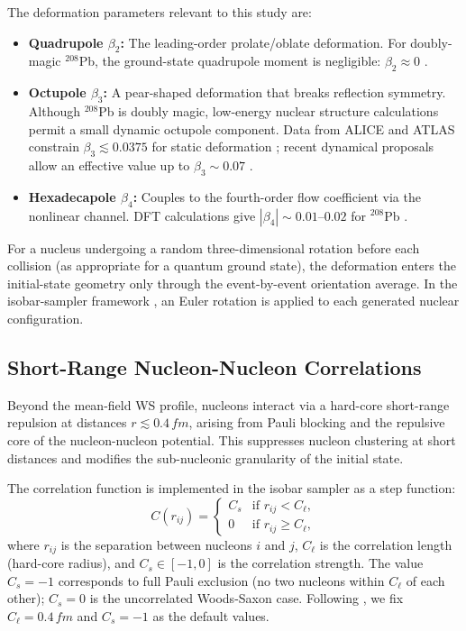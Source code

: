 \documentclass[12pt,a4paper,twoside]{report}
\begin{document}
The deformation parameters relevant to this study are:
\begin{itemize}[leftmargin=*]
  \item \textbf{Quadrupole $\beta_2$:}  The leading-order prolate/oblate
        deformation.  For doubly-magic $^{208}$Pb, the ground-state
        quadrupole moment is negligible: $\beta_2 \approx 0$
        \cite{Roca-Maza2018}.
  \item \textbf{Octupole $\beta_3$:}  A pear-shaped deformation that breaks
        reflection symmetry.  Although $^{208}$Pb is doubly magic, low-energy
        nuclear structure calculations permit a small dynamic octupole
        component.  Data from ALICE and ATLAS constrain
        $\beta_3 \lesssim 0.0375$ for static deformation \cite{Carzon2020};
        recent dynamical proposals allow an effective value up to
        $\beta_3 \sim 0.07$ \cite{Xu2025}.
  \item \textbf{Hexadecapole $\beta_4$:}  Couples to the fourth-order flow
        coefficient via the nonlinear channel.  DFT calculations give
        $|\beta_4| \sim 0.01$--$0.02$ for $^{208}$Pb \cite{Bally2022}.
\end{itemize}

For a nucleus undergoing a random three-dimensional rotation before
each collision (as appropriate for a quantum ground state), the
deformation enters the initial-state geometry only through the
event-by-event orientation average.  In the isobar-sampler framework
\cite{Luzum2023_sampler}, an Euler rotation is applied to each
generated nuclear configuration.

\subsection{Short-Range Nucleon-Nucleon Correlations}
\label{subsec:correlations}

Beyond the mean-field WS profile, nucleons interact via a hard-core
short-range repulsion at distances $r \lesssim 0.4\,\si{fm}$, arising
from Pauli blocking and the repulsive core of the nucleon-nucleon
potential.  This suppresses nucleon clustering at short distances and
modifies the sub-nucleonic granularity of the initial state.

The correlation function is implemented in the isobar sampler as a
step function:
\begin{equation}
  C(r_{ij}) =
  \begin{cases}
    C_s & \text{if } r_{ij} < C_\ell, \\
    0   & \text{if } r_{ij} \geq C_\ell,
  \end{cases}
  \label{eq:corr_function}
\end{equation}
where $r_{ij}$ is the separation between nucleons $i$ and $j$, $C_\ell$
is the correlation length (hard-core radius), and $C_s \in [-1, 0]$ is
the correlation strength.  The value $C_s = -1$ corresponds to full
Pauli exclusion (no two nucleons within $C_\ell$ of each other);
$C_s = 0$ is the uncorrelated Woods-Saxon case.  Following
\cite{Luzum2023_sampler}, we fix $C_\ell = 0.4\,\si{fm}$ and
$C_s = -1$ as the default values.
\end{document}
